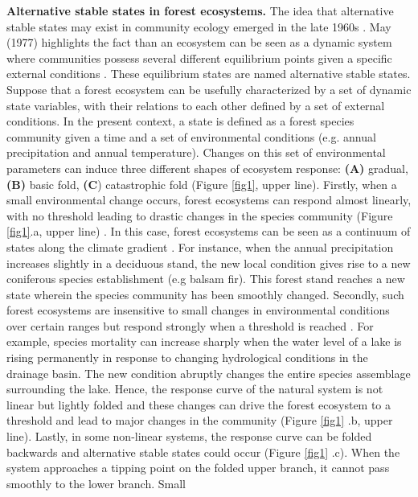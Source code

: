 \textbf{Alternative stable states in forest ecosystems.} The idea that
alternative stable states may exist in community ecology emerged in the late
1960s \cite{Scheffer2001,Society2014a}. May (1977) highlights the fact than an
ecosystem can be seen as a dynamic system where communities possess several
different equilibrium points given a specific external conditions
\cite{May1977}. These equilibrium states are named alternative stable states.
Suppose that a forest ecosystem can be usefully characterized by a set of
dynamic state variables, with their relations to each other defined by a set
of external conditions. In the present context, a state is defined as a forest
species community given a time and a set of environmental conditions (e.g.
annual precipitation and annual temperature). Changes on this set of
environmental parameters can induce three different shapes of ecosystem
response: \textbf{(A)} gradual, \textbf{(B)} basic fold, \textbf{(C})
catastrophic fold  \cite{Scheffer2001} (Figure \ref{fig1}, upper line).
Firstly, when a small environmental change occurs, forest ecosystems can
respond almost linearly, with no threshold leading to drastic changes in the
species community (Figure \ref{fig1}.a, upper line)
\cite{Scheffer2001,Scheffer2009}. In this case, forest ecosystems can be seen
as a continuum of states along the climate gradient
\cite{Scheffer2001,Scheffer2009,scheffer2009critical}. For instance, when the
annual precipitation increases slightly in a deciduous stand, the new local
condition gives rise to a new coniferous species establishment (e.g balsam
fir). This forest stand reaches a new state wherein the species community has
been smoothly changed. Secondly, such forest ecosystems are insensitive to
small changes in environmental conditions over certain ranges but respond
strongly when a threshold is reached \cite{scheffer2009critical}. For example,
species mortality can increase sharply when the water level of a lake is
rising permanently in response to changing hydrological conditions in the
drainage basin. The new condition abruptly changes the entire species
assemblage surrounding the lake. Hence, the response curve of the natural
system is not linear but lightly folded and these changes can drive the forest
ecosystem to a threshold and lead to major changes in the community (Figure
\ref{fig1} .b, upper line). Lastly, in some non-linear systems, the response
curve can be folded backwards and alternative stable states could occur
(Figure \ref{fig1} .c). When the system approaches a tipping point on the
folded upper branch, it cannot pass smoothly to the lower branch. Small
